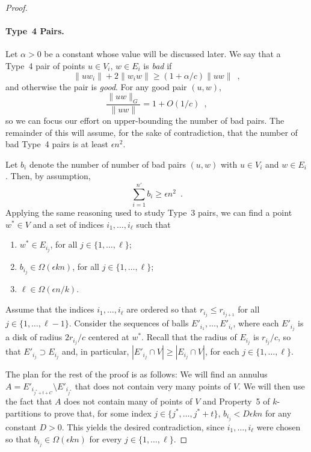 \documentclass{patmorin}
\begin{document}
\begin{proof}
  \paragraph{Type~4 Pairs.}  
  Let $\alpha > 0$ be a constant whose value will be discussed later.
  We say that a Type~4 pair of points $u\in V_i$, $w\in E_i$ is
  \emph{bad} if
  \[
      \|uw_i\|+2\|w_iw\| \ge (1+\alpha/c)\|uw\| \enspace ,
  \]
  and otherwise the pair is \emph{good}.
  For any good pair $(u,w)$,
  \[
    \frac{\|uw\|_G}{\|uw\|} = 1+O(1/c) \enspace ,
  \]
  so we can focus our effort on upper-bounding the number of bad pairs.
  The remainder of this will assume, for the sake of contradiction,
  that the number of bad Type~4 pairs is at least $\epsilon n^2$.

  Let $b_i$ denote the number of number of bad pairs $(u,w)$ with
  $u\in V_i$ and $w\in E_i$.  Then, by assumption,
  \[
    \sum_{i=1}^{n'} b_i \ge \epsilon n^2 \enspace .
  \]
  Applying the same reasoning used to study Type~3 pairs, we can find a
  point $w^*\in V$ and a set of indices $i_1,\ldots,i_{\ell}$ such that
  \begin{enumerate}
    \item $w^*\in E_{i_j}$, for all $j\in\{1,\ldots,\ell\}$;
    \item $b_{i_j} \in \Omega(\epsilon kn)$, for all $j\in\{1,\ldots,\ell\}$;
    \item $\ell\in \Omega(\epsilon n/k)$.
  \end{enumerate}

  Assume that the indices $i_1,\ldots,i_\ell$ are ordered so that
  $r_{i_j}\le r_{i_{j+1}}$ for all $j\in\{1,\ldots,\ell-1\}$.  Consider
  the sequences of balls $E'_{i_1},\ldots,E'_{i_\ell}$, where each
  $E'_{i_j}$ is a disk of radius $2r_{i_j}/c$ centered at $w^*$. Recall
  that the radius of $E_{i_j}$ is $r_{i_j}/c$, so that $E'_{i_j}\supset
  E_{i_j}$ and, in particular, $|E'_{i_j}\cap V|\ge |E_{i_j}\cap V|$,
  for each $j\in\{1,\ldots,\ell\}$.

  The plan for the rest of the proof is as follows:  We will find an
  annulus $A=E'_{i_{j^*+t+C}}\setminus E'_{i_{j^*}}$ that does not contain
  very many points of $V$.  We will then use the fact that $A$ does not
  contain many of points of $V$ and Property~5 of $k$-partitions to prove
  that, for some index $j\in\{j^*,\ldots,j^*+t\}$, $b_{i_j}< D\epsilon kn$
  for any constant $D>0$.  This yields the desired contradiction, since
  $i_1,\ldots,i_\ell$ were chosen so that $b_{i_j}\in\Omega(\epsilon k n)$
  for every $j\in\{1,\ldots,\ell\}$.


\end{proof}
\end{document}
